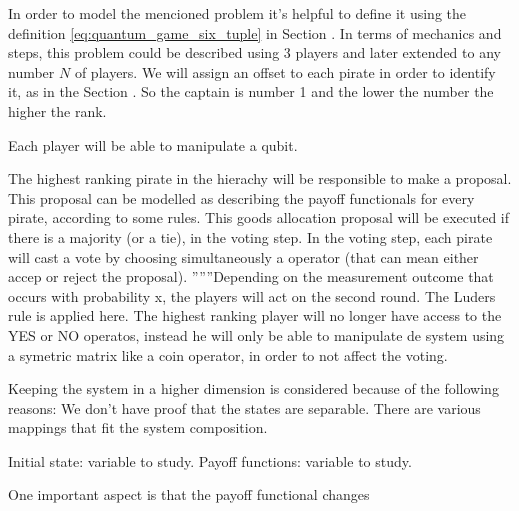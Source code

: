 In order to model the mencioned problem it's helpful to define it using the definition \ref{eq:quantum_game_six_tuple} in Section .
In terms of mechanics and steps, this problem could be described using 3 players and later extended to any number $N$ of players. We will assign an offset to each pirate in order to identify it, as in the Section \label{subsec:description}. So the captain is number 1 and the lower the number the higher the rank. 

Each player will be able to manipulate a qubit.




 The highest ranking pirate in the hierachy will be responsible to make a proposal. This proposal can be modelled as describing the payoff functionals for every pirate, according to some rules. This goods allocation proposal will be executed if there is a majority (or a tie), in the voting step. In the voting step, each pirate will cast a vote by choosing simultaneously a operator (that can mean either accep or reject the proposal).
''''''Depending on the measurement outcome that occurs with probability x, the players will act on the second round. The Luders rule is applied here. The highest ranking player will no longer have access to the YES or NO operatos, instead he will only be able to manipulate de system using a symetric matrix like a coin operator, in order to not affect the voting.

Keeping the system in a higher dimension is considered because of the following reasons: We don't have proof that the states are separable. There are various mappings that fit the system composition. 


Initial state: variable to study.
Payoff functions: variable to study.

\begin{emph}
One important aspect is that the payoff functional changes
\end{emph}
